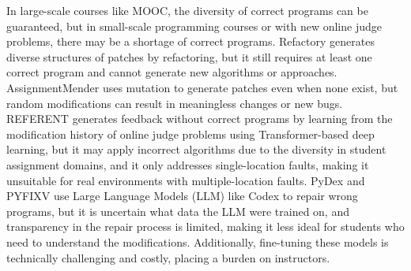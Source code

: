 \documentclass[10pt,conference]{IEEEtran}
\begin{document}
    In large-scale courses like MOOC, the diversity of correct programs can be guaranteed, but in small-scale programming courses or with new online judge problems, there may be a shortage of correct programs. Refactory\cite{hu2019re} generates diverse structures of patches by refactoring, but it still requires at least one correct program and cannot generate new algorithms or approaches. AssignmentMender\cite{li2022generating} uses mutation to generate patches even when none exist, but random modifications can result in meaningless changes or new bugs. REFERENT\cite{heo2023referent} generates feedback without correct programs by learning from the modification history of online judge problems using Transformer-based deep learning, but it may apply incorrect algorithms due to the diversity in student assignment domains, and it only addresses single-location faults, making it unsuitable for real environments with multiple-location faults. PyDex\cite{zhang2024pydex} and PYFIXV\cite{phung2023generating} use Large Language Models (LLM) like Codex to repair wrong programs, but it is uncertain what data the LLM were trained on, and transparency in the repair process is limited, making it less ideal for students who need to understand the modifications. Additionally, fine-tuning these models is technically challenging and costly, placing a burden on instructors\cite{joshi2023repair}.
\end{document}
